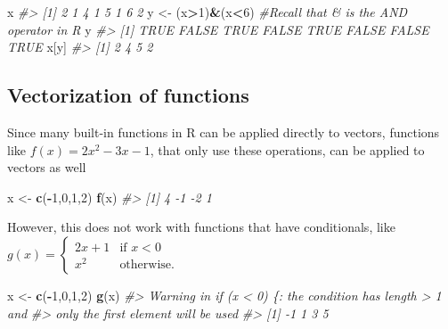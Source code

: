\documentclass[
]{book}
\newenvironment{Shaded}{\begin{snugshade}}{\end{snugshade}}
\newcommand{\CommentTok}[1]{\textcolor[rgb]{0.56,0.35,0.01}{\textit{#1}}}
\newcommand{\DecValTok}[1]{\textcolor[rgb]{0.00,0.00,0.81}{#1}}
\newcommand{\FunctionTok}[1]{\textcolor[rgb]{0.13,0.29,0.53}{\textbf{#1}}}
\newcommand{\NormalTok}[1]{#1}
\newcommand{\OtherTok}[1]{\textcolor[rgb]{0.56,0.35,0.01}{#1}}
\newcommand{\SpecialCharTok}[1]{\textcolor[rgb]{0.81,0.36,0.00}{\textbf{#1}}}
\theoremstyle{definition}
\theoremstyle{definition}
\theoremstyle{definition}
\theoremstyle{definition}
\theoremstyle{remark}
\begin{document}
\begin{Shaded}
\begin{Highlighting}[]
\NormalTok{x}
\CommentTok{\#\textgreater{} [1] 2 1 4 1 5 1 6 2}
\NormalTok{y }\OtherTok{\textless{}{-}}\NormalTok{ (x}\SpecialCharTok{\textgreater{}}\DecValTok{1}\NormalTok{)}\SpecialCharTok{\&}\NormalTok{(x}\SpecialCharTok{\textless{}}\DecValTok{6}\NormalTok{) }\CommentTok{\#Recall that \& is the AND operator in R}
\NormalTok{y}
\CommentTok{\#\textgreater{} [1]  TRUE FALSE  TRUE FALSE  TRUE FALSE FALSE  TRUE}
\NormalTok{x[y]}
\CommentTok{\#\textgreater{} [1] 2 4 5 2}
\end{Highlighting}
\end{Shaded}

\hypertarget{vectorize}{%
\subsection{Vectorization of functions}\label{vectorize}}

Since many built-in functions in R can be applied directly to vectors, functions like \(f(x)=2x^2-3x-1\), that only use these operations, can be applied to vectors as well

\begin{Shaded}
\begin{Highlighting}[]
\NormalTok{x }\OtherTok{\textless{}{-}} \FunctionTok{c}\NormalTok{(}\SpecialCharTok{{-}}\DecValTok{1}\NormalTok{,}\DecValTok{0}\NormalTok{,}\DecValTok{1}\NormalTok{,}\DecValTok{2}\NormalTok{)}
\FunctionTok{f}\NormalTok{(x)}
\CommentTok{\#\textgreater{} [1]  4 {-}1 {-}2  1}
\end{Highlighting}
\end{Shaded}

However, this does not work with functions that have conditionals, like \(g(x)=\begin{cases}2x+1&\text{if }x<0\\x^2 &\text{otherwise.} \end{cases}\)

\begin{Shaded}
\begin{Highlighting}[]
\NormalTok{x }\OtherTok{\textless{}{-}} \FunctionTok{c}\NormalTok{(}\SpecialCharTok{{-}}\DecValTok{1}\NormalTok{,}\DecValTok{0}\NormalTok{,}\DecValTok{1}\NormalTok{,}\DecValTok{2}\NormalTok{)}
\FunctionTok{g}\NormalTok{(x)}
\CommentTok{\#\textgreater{} Warning in if (x \textless{} 0) \{: the condition has length \textgreater{} 1 and}
\CommentTok{\#\textgreater{} only the first element will be used}
\CommentTok{\#\textgreater{} [1] {-}1  1  3  5}
\end{Highlighting}
\end{Shaded}
\end{document}
